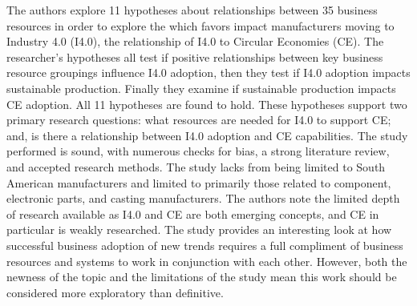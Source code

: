 \renewcommand{\mykey}{bagKeyResourcesIndustry2021}
\fakesection{\citeauthor{\mykey} \citeyear{\mykey} }
\fullcitebib{\mykey}

The authors explore 11 hypotheses about relationships between 35 business resources in order to explore the which favors impact manufacturers moving to Industry 4.0 (I4.0), the relationship of I4.0 to Circular Economies (CE). The researcher's hypotheses all test if positive relationships between key business resource groupings influence I4.0 adoption, then they test if I4.0 adoption impacts sustainable production. Finally they examine if sustainable production impacts CE adoption. All 11 hypotheses are found to hold. These hypotheses support two primary research questions: what resources are needed for I4.0 to support CE; and, is there a relationship between I4.0 adoption and CE capabilities. The study performed is sound, with numerous checks for bias, a strong literature review, and accepted research methods. The study lacks from being limited to South American manufacturers and limited to primarily those related to component, electronic parts, and casting manufacturers. The authors note the limited depth of research available as I4.0 and CE are both emerging concepts, and CE in particular is weakly researched. The study provides an interesting look at how successful business adoption of new trends requires a full compliment of business resources and systems to work in conjunction with each other. However, both the newness of the topic and the limitations of the study mean this work should be considered more exploratory than definitive.

\newpage
